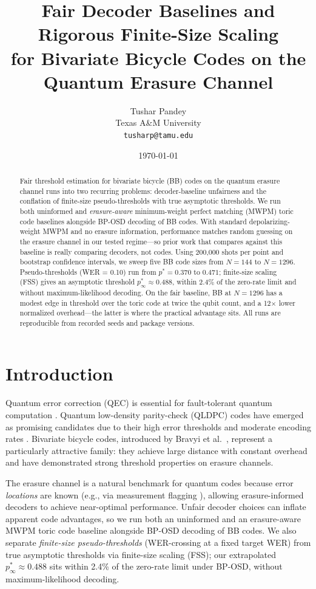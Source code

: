 \documentclass[twocolumn,10pt]{article}
\title{Fair Decoder Baselines and Rigorous Finite-Size Scaling\\
for Bivariate Bicycle Codes on the Quantum Erasure Channel}
\author{Tushar Pandey\\
\small Texas A\&M University\\
\small \texttt{tusharp@tamu.edu}}
\date{\today}
\begin{document}
\maketitle

\begin{abstract}
Fair threshold estimation for bivariate bicycle (BB) codes on the quantum erasure channel
runs into two recurring problems: decoder-baseline unfairness and the conflation of
finite-size pseudo-thresholds with true asymptotic thresholds.
We run both uninformed and \emph{erasure-aware} minimum-weight perfect matching (MWPM)
toric code baselines alongside BP-OSD decoding of BB codes.
With standard depolarizing-weight MWPM and no erasure information, performance matches
random guessing on the erasure channel in our tested regime---so prior work that compares
against this baseline is really comparing decoders, not codes.
Using 200{,}000 shots per point and bootstrap confidence intervals, we sweep five BB code
sizes from $N=144$ to $N=1296$.
Pseudo-thresholds (WER = 0.10) run from $p^* = 0.370$ to $0.471$; finite-size scaling
(FSS) gives an asymptotic threshold $p^*_\infty \approx 0.488$, within 2.4\% of the
zero-rate limit and without maximum-likelihood decoding.
On the fair baseline, BB at $N=1296$ has a modest edge in threshold over the toric code
at twice the qubit count, and a 12$\times$ lower normalized overhead---the latter is
where the practical advantage sits.
All runs are reproducible from recorded seeds and package versions.
\end{abstract}

\section{Introduction}

Quantum error correction (QEC) is essential for fault-tolerant quantum computation
\cite{nielsen2010quantum, gottesman1997stabilizer}.
Quantum low-density parity-check (QLDPC) codes have emerged as promising candidates due to
their high error thresholds and moderate encoding rates
\cite{bravyi2024high, tillich2014quantum, kovalev2013improved}.
Bivariate bicycle codes, introduced by Bravyi et al.\ \cite{bravyi2024high}, represent a
particularly attractive family: they achieve large distance with constant overhead and have
demonstrated strong threshold properties on erasure channels.

The erasure channel is a natural benchmark for quantum codes because error \emph{locations} are
known (e.g., via measurement flagging \cite{grassl2004codes}), allowing erasure-informed decoders
to achieve near-optimal performance.
Unfair decoder choices can inflate apparent code advantages, so we run both an uninformed
and an erasure-aware MWPM toric code baseline alongside BP-OSD decoding of BB codes.
We also separate \emph{finite-size pseudo-thresholds} (WER-crossing at a fixed target WER)
from true asymptotic thresholds via finite-size scaling (FSS); our extrapolated
$p^*_\infty \approx 0.488$ sits within 2.4\% of the zero-rate limit under BP-OSD, without
maximum-likelihood decoding.
\end{document}
